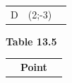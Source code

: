 {{\begin{center}
\begin{tabular}[t]{|l|l|l|}
        D &
    
    
        (2;-3) &
    
    
     \tabularnewline\cline{1-1}\cline{2-2}\cline{3-3}
    \end{tabular}
      \end{center}
    \begin{center}{\small\bfseries Table 13.5}\end{center}
    
    \addtocounter{footnote}{-0}
    
          }{ %
        
    
        \begin{center}
      
      \label{m39358*id71867}
      
    \noindent
      \tablelasttail{}
      \begin{xtabular}[t]{|l|l|l|}\hline
    
    
         &
    
    
        
                    \textbf{Point}
                   &
    

\end{xtabular}
\end{center}}}
